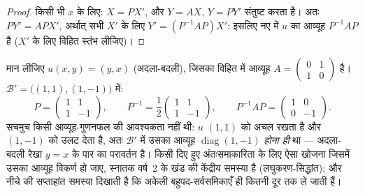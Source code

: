 \begin{proof}
किसी भी $x$ के लिए: $X = PX'$, और  $Y = AX$, $Y = PY'$ संतुष्ट करता
है। अतः $PY' = APX'$, अर्थात् सभी $X'$ के लिए $Y' = (P^{-1}AP)X'$: इसलिए नए
 में $u$ का आव्यूह $P^{-1}AP$ है ($X'$ के लिए विहित स्तंभ लीजिए)।
\end{proof}

\begin{example}[अच्छा आधार प्रतिचित्रण को पारदर्शी बना देता है]
\label{ex:b1:matrices:conjugationrun}
मान लीजिए $u(x, y) = (y, x)$ (अदला-बदली), जिसका विहित  में आव्यूह $A =
\begin{pmatrix} 0 & 1\\ 1 & 0\end{pmatrix}$ है।  $\mathcal B' =
\bigl((1,1), (1,-1)\bigr)$ में:
\[
P = \begin{pmatrix} 1 & 1\\ 1 & -1 \end{pmatrix},
\qquad
P^{-1} = \frac12\begin{pmatrix} 1 & 1\\ 1 & -1 \end{pmatrix},
\qquad
P^{-1} A P = \begin{pmatrix} 1 & 0\\ 0 & -1 \end{pmatrix}.
\]
सचमुच किसी आव्यूह-गुणनफल की आवश्यकता नहीं थी: $u$ $(1,1)$ को अचल रखता है और
$(1,-1)$ को उलट देता है, अतः $\mathcal B'$ में उसका आव्यूह
$\operatorname{diag}(1, -1)$ \emph{होना ही} था --- अदला-बदली रेखा $y = x$ के
पार का परावर्तन है। किसी दिए हुए अंतःसमाकारिता के लिए ऐसा  खोजना जिसमें
उसका आव्यूह विकर्ण हो जाए, स्नातक वर्ष~2 के खंड की केंद्रीय समस्या है
(लघुकरण-सिद्धांत); और नीचे की सप्ताहांत समस्या दिखाती है कि अकेली
बहुपद-सर्वसमिकाएँ ही कितनी दूर तक ले जाती हैं।
\end{example}

